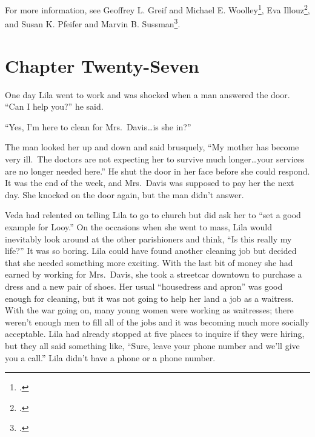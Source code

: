 \documentclass[
  letterpaper,
]{book}
\begin{document}
For more information, see Geoffrey L. Greif and Michael E.
Woolley\footnote{.}, Eva
Illouz\footnote{.}, and Susan K. Pfeifer and
Marvin B. Sussman\footnote{.}.


\chapter{Chapter Twenty-Seven}\label{chapter-twenty-seven}

One day Lila went to work and was shocked when a man answered the door.
``Can I help you?'' he said.

``Yes, I'm here to clean for Mrs.~Davis\ldots is she in?''

The man looked her up and down and said brusquely, ``My mother has
become very ill.~The doctors are not expecting her to survive much
longer\ldots your services are no longer needed here.'' He shut the door
in her face before she could respond. It was the end of the week, and
Mrs.~Davis was supposed to pay her the next day. She knocked on the door
again, but the man didn't answer.

Veda had relented on telling Lila to go to church but did ask her to
``set a good example for Looy.'' On the occasions when she went to mass,
Lila would inevitably look around at the other parishioners and think,
``Is this really my life?'' It was so boring. Lila could have found
another cleaning job but decided that she needed something more
exciting. With the last bit of money she had earned by working for
Mrs.~Davis, she took a streetcar downtown to purchase a dress and a new
pair of shoes. Her usual ``housedress and apron'' was good enough for
cleaning, but it was not going to help her land a job as a waitress.
With the war going on, many young women were working as waitresses;
there weren't enough men to fill all of the jobs and it was becoming
much more socially acceptable. Lila had already stopped at five places
to inquire if they were hiring, but they all said something like,
``Sure, leave your phone number and we'll give you a call.'' Lila didn't
have a phone or a phone number.
\end{document}
